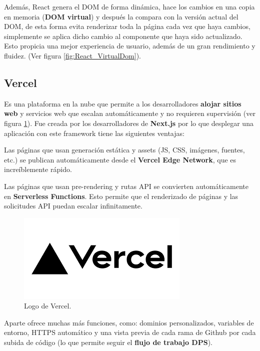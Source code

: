 \documentclass[12pt,twoside,titlepage]{report}
\begin{document}
Además, React genera el DOM de forma dinámica, hace los cambios en una copia en memoria (\textbf{DOM virtual}) y después la compara con la versión actual del DOM, de esta forma evita renderizar toda la página cada vez que haya cambios, simplemente se aplica dicho cambio al componente que haya sido actualizado. Esto propicia una mejor experiencia de usuario, además de un gran rendimiento y fluidez.
(Ver figura \ref{fig:React_VirtualDom}).

\subsection{Vercel}

Es una plataforma en la nube que permite a los desarrolladores \textbf{alojar sitios web} y servicios web que escalan automáticamente y no requieren supervisión (ver figura \ref{fig:VercelLogo}). Fue creada por los desarrolladores de \textbf{Next.js} por lo que desplegar una aplicación con este framework tiene las siguientes ventajas:


\begin{compactitem}
    \item Las páginas que usan generación estática y assets (JS, CSS, imágenes, fuentes, etc.) se publican automáticamente desde el \textbf{Vercel Edge Network}, que es increíblemente rápido.
    \item Las páginas que usan pre-rendering y rutas API se convierten automáticamente en \textbf{Serverless Functions}. Esto permite que el renderizado de páginas y las solicitudes API puedan escalar infinitamente.
\end{compactitem}

\begin{figure}[H]
    \centering
    \includegraphics[scale=0.5]{Vercel/Vercel}
    \caption{Logo de Vercel.}
    \label{fig:VercelLogo}
\end{figure}

Aparte ofrece muchas más funciones, como: dominios personalizados, variables de entorno, HTTPS automático y una vista previa de cada rama de Github por cada subida de código (lo que permite seguir el \textbf{flujo de trabajo DPS}).
\end{document}
